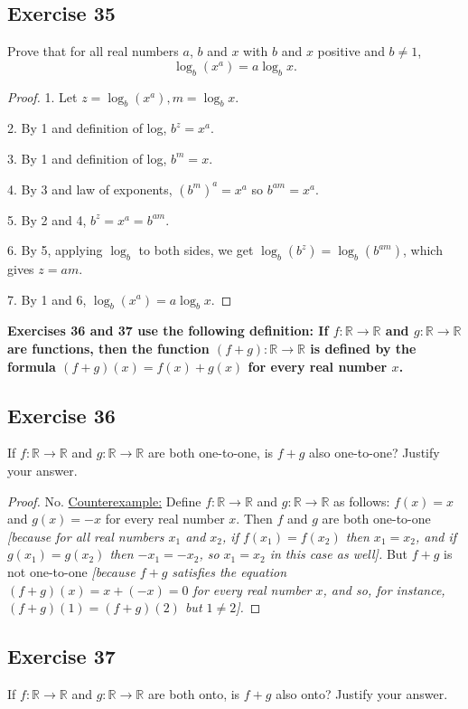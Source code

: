 \documentclass[14pt]{extarticle}
\newcommand{\R}{\mathbb{R}}
\newcommand{\cy}{\color{cyan}}
\begin{document}
\subsection{Exercise 35}
Prove that for all real numbers $a$, $b$ and $x$ with $b$ and $x$ positive and \(b \neq 1\),
\[
    \log_b (x^a) = a \log_b x.
\]
\begin{proof}
    1. Let \(z = \log_b(x^a), m = \log_b x\).

    2. By 1 and definition of log, \(b^z = x^a\).

    3. By 1 and definition of log, \(b^m = x\).

    4. By 3 and law of exponents, \((b^m)^a = x^a\) so \(b^{am} = x^a\).

    5. By 2 and 4, \(b^z = x^a = b^{am}\).

    6. By 5, applying $\log_b$ to both sides, we get \(\log_b(b^z) = \log_b(b^{am})\), which gives $z = am$.

    7. By 1 and 6, \(\log_b(x^a) = a \log_b x\).
\end{proof}

{\bf \cy Exercises 36 and 37 use the following definition: If \(f: \R \to \R\) and \(g: \R \to \R\) are functions,
then the function \((f + g): \R \to \R\) is defined by the formula \((f + g)(x) = f(x) + g(x)\) for every real number $x$.}

\subsection{Exercise 36}
If \(f: \R \to \R\) and \(g: \R \to \R\) are both one-to-one, is \(f + g\) also one-to-one? Justify your answer.

\begin{proof}
    No. \underline{Counterexample:} Define \(f: \R \to \R\) and \(g: \R \to \R\) as follows: \(f(x) = x\) and \(g(x) = -x\)
    for every real number $x$. Then $f$ and $g$ are both one-to-one {\it [because for all real numbers $x_1$ and $x_2$,
        if \(f(x_1) = f(x_2)\) then \(x_1 = x_2\), and if \(g(x_1) = g(x_2)\) then \(-x_1 = -x_2\), so \(x_1 = x_2\) in this
        case as well].} But \(f + g\) is not one-to-one {\it [because $f + g$ satisfies the equation \((f + g)(x) = x +
        (-x) = 0\) for every real number $x$, and so, for instance, \((f + g)(1) = (f + g)(2)\) but $1 \neq 2$].}
\end{proof}

\subsection{Exercise 37}
If \(f: \R \to \R\) and \(g: \R \to \R\) are both onto, is \(f + g\) also onto? Justify your answer.
\end{document}
